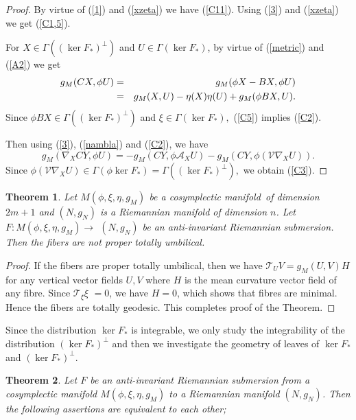 \documentclass{amsart}
\newtheorem{theorem}{Theorem}
\theoremstyle{plain}
\numberwithin{equation}{section}
\begin{document}
\begin{proof}
By virtue of (\ref{1}) and (\ref{xzeta}) we have (\ref{C11}). Using (\ref{3}) and (\ref{xzeta}) we get (\ref{C1,5}).

For $X\in \Gamma ((\ker F_{\ast })^{\bot })$ and $U\in \Gamma (\ker F_{\ast
})$, by virtue of (\ref{metric}) and (\ref{A2}) we get\begin{eqnarray}
g_{M}(CX,\phi U) &=&g_{M}(\phi X-BX,\phi U)  \label{C5} \\
&=&g_{M}(X,U)-\eta (X)\eta (U)+g_{M}(\phi BX,U).  \notag
\end{eqnarray}Since $\phi BX\in \Gamma ((\ker F_{\ast })^{\bot })$ and $\xi \in \Gamma
(\ker F_{\ast }),$ (\ref{C5}) implies (\ref{C2}).

Then using (\ref{3}), (\ref{nambla}) and (\ref{C2}), we have 
\begin{equation*}
g_{M}(\nabla _{X}CY,\phi U)=-g_{M}(CY,\phi \mathcal{A}_{X}U)-g_{M}(CY,\phi (\mathcal{V}\nabla _{X}U)).
\end{equation*}Since $\phi (\mathcal{V}\nabla _{X}U)\in \Gamma (\phi \ker F_{\ast })=\Gamma
((\ker F_{\ast })^{\bot }),$ we obtain (\ref{C3}).
\end{proof}

\begin{theorem}
Let $M(\phi ,\xi ,\eta ,g_{M})$ be a cosymplectic manifold\ of dimension $2m+1$ and $(N,g_{N})$ is a Riemannian manifold of dimension $n$. Let $F:M(\phi ,\xi ,\eta ,g_{M})\rightarrow $ $(N,g_{N})$ be an anti-invariant
Riemannian submersion. Then the fibers are not proper totally umbilical.
\end{theorem}

\begin{proof}
If the fibers are proper totally umbilical, then we have $\mathcal{T}_{U}V=g_{M}(U,V)H$ for any vertical vector fields $U,V$ where $H$ is the
mean curvature vector field of any fibre. Since $\mathcal{T}_{\xi }\xi $ $=0$, we have $H=0$, which shows that fibres are minimal. Hence the fibers are
totally geodesic. This completes proof of the Theorem.
\end{proof}

Since the distribution $\ker F_{\ast }$ is integrable, we only study the
integrability of the distribution $(\ker F_{\ast })^{\bot }$ and then we
investigate the geometry of leaves of $\ker F_{\ast }$ and $(\ker F_{\ast
})^{\bot }.$

\begin{theorem}
Let $F$ be an anti-invariant Riemannian submersion from a cosymplectic
manifold $M(\phi ,\xi ,\eta ,g_{M})$ to a Riemannian manifold $(N,g_{N})$.
Then the following assertions are equivalent to each other;
\end{theorem}
\end{document}
